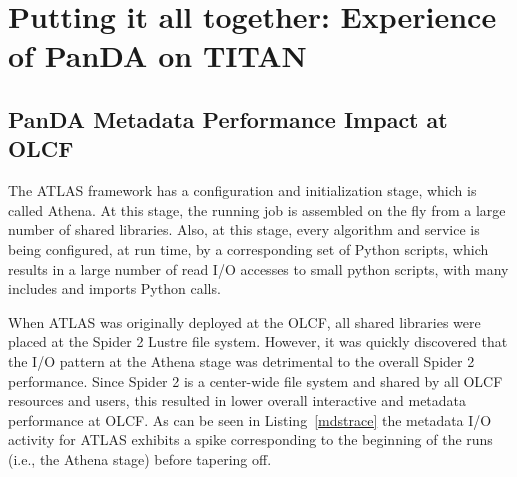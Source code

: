\section{Putting it all together: Experience of PanDA on TITAN} %
\label{sec:panda_titan}

\subsection{PanDA Metadata Performance Impact at OLCF}


The ATLAS framework has a configuration and initialization stage, which is
called Athena. At this stage, the running job is assembled  on the fly from a
large number of shared libraries.  Also, at this stage, every algorithm and
service is being configured, at run time, by a corresponding set of Python
scripts, which results in a large number of read I/O accesses to small python
scripts, with many includes and imports Python calls.

When ATLAS was originally deployed at the OLCF, all shared libraries were
placed at the Spider 2 Lustre file system. However, it was quickly discovered
that the I/O pattern at the Athena stage was detrimental to the overall Spider
2 performance. Since Spider 2 is a center-wide file system and shared by all
OLCF resources and users, this resulted in lower overall interactive and
metadata performance at OLCF. As can be seen in Listing~\ref{mdstrace} the
metadata I/O activity for ATLAS exhibits a spike corresponding to the beginning
of the runs (i.e., the Athena stage) before tapering off.

